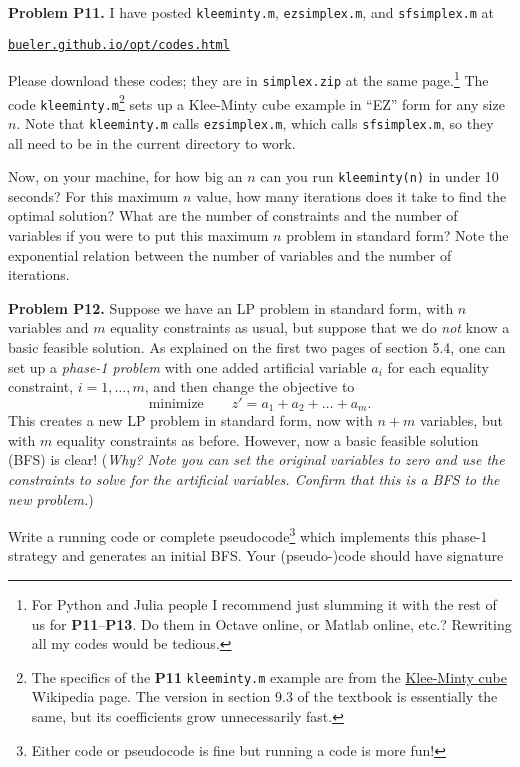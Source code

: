 \documentclass[12pt]{amsart}
\newcommand{\prob}[1]{\bigskip\noindent\textbf{#1}\quad }
\begin{document}
\prob{Problem P11.}  I have posted \texttt{kleeminty.m}, \texttt{ezsimplex.m}, and \texttt{sfsimplex.m} at

\centerline{\href{https://bueler.github.io/opt/codes.html}{\texttt{bueler.github.io/opt/codes.html}}}

\noindent Please download these codes; they are in \texttt{simplex.zip} at the same page.\footnote{For Python and Julia people I recommend just slumming it with the rest of us for \textbf{P11}--\textbf{P13}.  Do them in Octave online, or Matlab online, etc.?  Rewriting all my codes would be tedious.}  The code \texttt{kleeminty.m}\footnote{The specifics of the \textbf{P11} \texttt{kleeminty.m} example are from the \href{https://en.wikipedia.org/wiki/Klee-Minty_cube}{Klee-Minty cube} Wikipedia page.  The version in section 9.3 of the textbook is essentially the same, but its coefficients grow unnecessarily fast.} sets up a Klee-Minty cube example in ``EZ'' form for any size $n$.  Note that \texttt{kleeminty.m} calls \texttt{ezsimplex.m}, which calls \texttt{sfsimplex.m}, so they all need to be in the current directory to work.

Now, on your machine, for how big an $n$ can you run \texttt{kleeminty(n)} in under 10 seconds?  For this maximum $n$ value, how many iterations does it take to find the optimal solution?  What are the number of constraints and the number of variables if you were to put this maximum $n$ problem in standard form?  Note the exponential relation between the number of variables and the number of iterations.


\prob{Problem P12.}  Suppose we have an LP problem in standard form, with $n$ variables and $m$ equality constraints as usual, but suppose that we do \emph{not} know a basic feasible solution.  As explained on the first two pages of section 5.4, one can set up a \emph{phase-1 problem} with one added artificial variable $a_i$ for each equality constraint, $i=1,\dots,m$, and then change the objective to
    $$\text{minimize} \qquad z' = a_1 + a_2 + \dots + a_m.$$
This creates a new LP problem in standard form, now with $n+m$ variables, but with $m$ equality constraints as before.  However, now a basic feasible solution (BFS) is clear!  (\emph{Why?  Note you can set the original variables to zero and use the constraints to solve for the artificial variables.  Confirm that this is a BFS to the new problem.})

Write a running code or complete pseudocode\footnote{Either code or pseudocode is fine but running a code is more fun!} which implements this phase-1 strategy and generates an initial BFS.  Your (pseudo-)code should have signature
\end{document}
